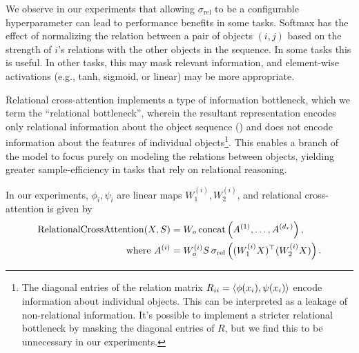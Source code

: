 We observe in our experiments that allowing $\sigma_{\mathrm{rel}}$ to be a configurable hyperparameter can lead to performance benefits in some tasks. Softmax has the effect of normalizing the relation between a pair of objects $(i,j)$ based on the strength of $i$'s relations with the other objects in the sequence. In some tasks this is useful. In other tasks, this may mask relevant information, and element-wise activations (e.g., tanh, sigmoid, or linear) may be more appropriate.

Relational cross-attention implements a type of information bottleneck, which we term the ``relational bottleneck'', wherein the resultant representation encodes only relational information about the object sequence () and does not encode information about the features of individual objects\footnote{The diagonal entries of the relation matrix $R_{ii} = \left \langle \phi(x_i), \psi(x_i) \right\rangle$ encode information about individual objects. This can be interpreted as a leakage of non-relational information. It's possible to implement a stricter relational bottleneck by masking the diagonal entries of $R$, but we find this to be unnecessary in our experiments.}. This enables a branch of the model to focus purely on modeling the relations between objects, yielding greater sample-efficiency in tasks that rely on relational reasoning.


In our experiments, $\phi_i, \psi_i$ are linear maps $W_1^{(i)}, W_2^{(i)}$, and relational cross-attention is given by
\begin{equation}
    \begin{split}
        \mathrm{RelationalCrossAttention}(X, S) &= W_o \, \mathrm{concat}\left(A^{(1)}, \ldots, A^{(d_r)}\right), \\
        \text{where } A^{(i)} &= W_o^{(i)} S \, \sigma_{\mathrm{rel}}\left((W_1^{(i)} X)^\top (W_2^{(i)} X)\right).
    \end{split}
\end{equation}

